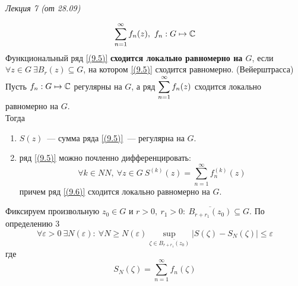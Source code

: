 \begin{flushright}
    \textit{Лекция 7 (от 28.09)}
\end{flushright}
\begin{equation}\label{(9.5)}
    \sum_{n=1}^{\infty}f_n(z), \ f_n: G \mapsto \mathbb{C}
\end{equation}
\Def
Функциональный ряд \eqref{(9.5)} \textbf{сходится локально равномерно на $G$},
если $\forall z \in G \ \exists B_r(z) \subseteq G$, на котором \eqref{(9.5)}
сходится равномерно.
\theorem (Вейерштрасса)
Пусть $f_n: G \mapsto \mathbb{C}$ регулярны на $G$, а ряд $\displaystyle
\sum_{n=1}^{\infty}f_n(z)$ сходится локально равномерно на $G$.
\\
Тогда
\begin{enumerate}
    \item $S(z)$~--- сумма ряда \eqref{(9.5)}~--- регулярна на $G$.
    \item ряд \eqref{(9.5)} можно почленно дифференцировать:
    \begin{equation}\label{(9.6)}
        \forall k \in NN, \ \forall z \in G \ S^{(k)}(z) = \sum_{n=1}^{\infty}f^{(k)}_n(z)
    \end{equation}
    причем ряд \eqref{(9.6)} сходится локально равномерно на $G$.
\end{enumerate}
\pr
Фиксируем произвольную $z_0 \in G$ и $r>0, \ r_1>0: \ \overline{B_{r+r_1}(z_0)}
\subseteq G$. По определению $3$
\begin{equation}\label{(9.7)}
    \forall \varepsilon > 0 \ \exists N(\varepsilon): \ \forall N \geq N(\varepsilon) \sup_{\zeta \in \overline{B_{r+r_1}(z_0)}}\left| S(\zeta) - S_N(\zeta) \right| \leq \varepsilon
\end{equation}
где
\begin{equation}\label{(9.8)}
    S_N(\zeta) = \sum_{n=1}^{\infty}f_n(\zeta)
\end{equation}
